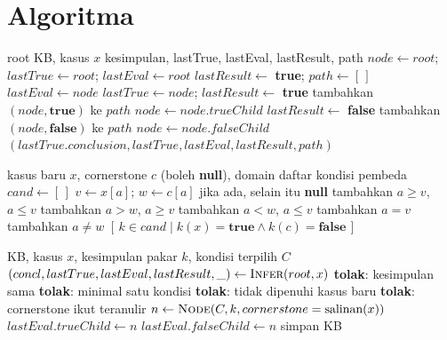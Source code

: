 \documentclass[11pt,a4paper]{article}
\begin{document}
\section{Algoritma}

\begin{algorithm}[H]
\caption{Inferensi}
\begin{algorithmic}[1]
\Require root KB, kasus $x$
\Ensure kesimpulan, lastTrue, lastEval, lastResult, path
\State $node \gets root$; \quad $lastTrue \gets root$; \quad $lastEval \gets root$
\State $lastResult \gets$ \textbf{true}; \quad $path \gets [\,]$
  \State $lastEval \gets node$
    \State $lastTrue \gets node$; \quad $lastResult \gets$ \textbf{true}
    \State tambahkan $(node, \textbf{true})$ ke $path$
    \State $node \gets node.trueChild$ 
  \Else
    \State $lastResult \gets$ \textbf{false}
    \State tambahkan $(node, \textbf{false})$ ke $path$
    \State $node \gets node.falseChild$ 
  \EndIf
\EndWhile
\State \Return $(lastTrue.conclusion, lastTrue, lastEval, lastResult, path)$
\end{algorithmic}
\end{algorithm}

\begin{algorithm}[H]
\caption{Pembangkitan Difference List}
\begin{algorithmic}[1]
\Require kasus baru $x$, cornerstone $c$ (boleh \textbf{null}), domain
\Ensure daftar kondisi pembeda
\State $cand \gets [\,]$
  \State $v \gets x[a]$; \quad $w \gets c[a]$ jika ada, selain itu \textbf{null}
     tambahkan $a \geq v$, $a \leq v$
     tambahkan $a > w$, $a \geq v$
     tambahkan $a < w$, $a \leq v$
    \EndIf
  \Else
    \State tambahkan $a = v$
     tambahkan $a \neq w$ \EndIf
  \EndIf
\EndFor
\State \Return $[\,k \in cand \mid k(x) = \textbf{true} \wedge k(c) = \textbf{false}\,]$
\end{algorithmic}
\end{algorithm}

\begin{algorithm}[H]
\caption{Penambahan Rule}
\begin{algorithmic}[1]
\Require KB, kasus $x$, kesimpulan pakar $k$, kondisi terpilih $C$
\State $(concl, lastTrue, lastEval, lastResult, \_) \gets \Call{Infer}{root, x}$
 \textbf{tolak}: kesimpulan sama \EndIf
{} \textbf{tolak}: minimal satu kondisi \EndIf
{}
   \textbf{tolak}: tidak dipenuhi kasus baru \EndIf
   \textbf{tolak}: cornerstone ikut teranulir \EndIf
\EndFor
\State $n \gets \Call{Node}{C, k, cornerstone = \text{salinan}(x)}$
  \State $lastEval.trueChild \gets n$
\Else
  \State $lastEval.falseChild \gets n$
\EndIf
\State simpan KB
\end{algorithmic}
\end{algorithm}
\end{document}
